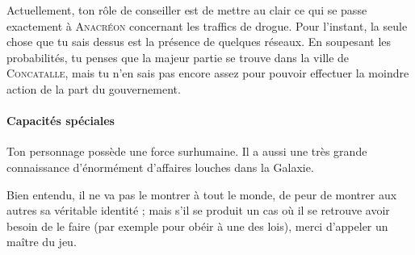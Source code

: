 \documentclass{article}
\begin{document}
{Actuellement, ton rôle de conseiller est de mettre au clair ce qui se passe exactement à \textsc{Anacréon} concernant les traffics de drogue.
Pour l’instant, la seule chose que tu sais dessus est la présence de quelques réseaux.
En soupesant les probabilités, tu penses que la majeur partie se trouve dans la ville de \textsc{Concatalle}, mais tu n’en sais pas encore assez pour pouvoir effectuer la moindre action de la part du gouvernement.

\paragraph{Capacités spéciales}
{
Ton personnage possède une force surhumaine.
Il a aussi une très grande connaissance d’énormément d’affaires louches dans la Galaxie.

Bien entendu, il ne va pas le montrer à tout le monde, de peur de montrer aux autres sa véritable identité ; mais s’il se produit un cas où il se retrouve avoir besoin de le faire (par exemple pour obéir à une des lois), merci d’appeler un maître du jeu.
}
}
\end{document}
